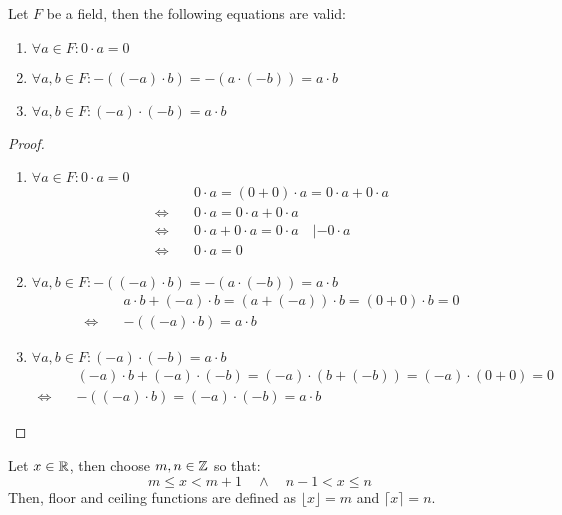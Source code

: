\begin{lemma}
    Let $F$ be a field, then the following equations are valid:
    \begin{enumerate}
        \item $\forall a \in F: 0 \cdot a = 0$
        \item $\forall a,b \in F: -((-a) \cdot b) = -(a \cdot (-b)) = a \cdot b$
        \item $\forall a,b \in F: (-a) \cdot (-b) = a \cdot b$
    \end{enumerate}
\end{lemma}
\begin{proof}
    \begin{enumerate}
        \item $\forall a \in F: 0 \cdot a = 0$
        \begin{align}
                                  & 0 \cdot a = (0 + 0) \cdot a = 0 \cdot a + 0 \cdot a \nonumber \\
            \Leftrightarrow \quad & 0 \cdot a = 0 \cdot a + 0 \cdot a \nonumber \\
            \Leftrightarrow \quad & 0 \cdot a + 0 \cdot a = 0 \cdot a  \quad | - 0 \cdot a \nonumber \\
            \Leftrightarrow \quad & 0 \cdot a = 0 
        \end{align}
        \item $\forall a,b \in F: -((-a) \cdot b) = -(a \cdot (-b)) = a \cdot b$
        \begin{align}
            & a \cdot b + (-a) \cdot b = (a + (-a)) \cdot b = (0 + 0) \cdot b = 0 \nonumber \\
            \Leftrightarrow \quad & -((-a) \cdot b) = a \cdot b
        \end{align}
        \item $\forall a,b \in F: (-a) \cdot (-b) = a \cdot b$
        \begin{align}
            & (-a) \cdot b + (-a) \cdot (-b) = (-a) \cdot (b + (-b)) = (-a) \cdot (0 + 0) = 0 \nonumber \\
            \Leftrightarrow \quad & -((-a) \cdot b) = (-a) \cdot (-b) = a \cdot b
        \end{align}
    \end{enumerate}
\end{proof}

\begin{definition}
    Let $x \in \mathbb{R}$, then choose $m,n \in \mathbb{Z}$ so that:
    \begin{equation}
        m \le x < m + 1 \quad \land \quad n - 1 < x \le n
    \end{equation}
    Then, floor and ceiling functions are defined as 
    $\lfloor x \rfloor = m$ and 
    $\lceil x \rceil = n$.
\end{definition}

